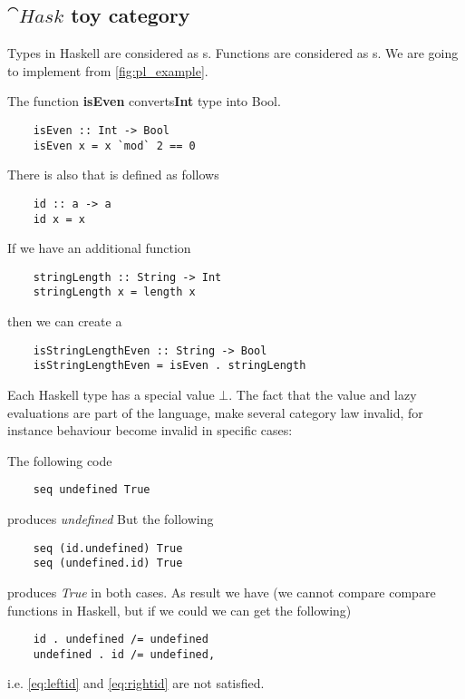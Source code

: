 \subsection{$\cat{Hask}$ toy category}
\begin{example}
  \label{ex:haskcategory}
  Types in Haskell are considered as s.
  Functions are considered as s.
  We are going to implement  from
  \cref{fig:pl_example}.

  The function \textbf{isEven}
  converts\textbf{Int} type 
  into Bool.
  \begin{verbatim}
    isEven :: Int -> Bool
    isEven x = x `mod` 2 == 0
  \end{verbatim}

  There is also  that is defined as follows
  \begin{verbatim}
    id :: a -> a
    id x = x
  \end{verbatim}

  If we have an additional function
  \begin{verbatim}
    stringLength :: String -> Int
    stringLength x = length x
  \end{verbatim}
  then we can create a 
  \begin{verbatim}
    isStringLengthEven :: String -> Bool
    isStringLengthEven = isEven . stringLength
  \end{verbatim}

\end{example}

\begin{remark}
  \label{rem:hask_lazy_eval}
  Each Haskell type has a special value $\bot$. The fact that the
  value and lazy evaluations are part of the language, make several
  category law invalid, for instance 
   behaviour become invalid in specific cases:

  The following code
  \begin{verbatim}
    seq undefined True
  \end{verbatim}
  produces \textit{undefined}
  But the following
  \begin{verbatim}
    seq (id.undefined) True
    seq (undefined.id) True
  \end{verbatim}
  produces \textit{True} in both cases.
  As result we have
  (we cannot compare compare functions in Haskell, but if we
  could we can get the following)
  \begin{verbatim}
    id . undefined /= undefined
    undefined . id /= undefined,
  \end{verbatim}
  i.e. \eqref{eq:leftid} and
  \eqref{eq:rightid} are not satisfied.  
\end{remark}

